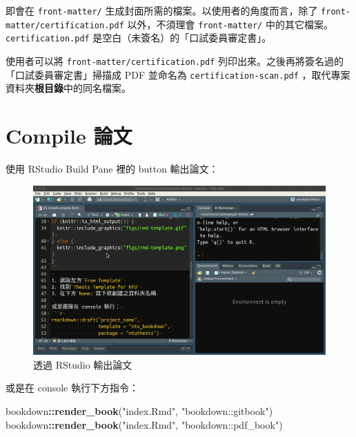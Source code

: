 \documentclass[oneside]{book}
\newenvironment{Shaded}{\begin{snugshade}}{\end{snugshade}}
\newcommand{\KeywordTok}[1]{\textcolor[rgb]{0.13,0.29,0.53}{\textbf{#1}}}
\newcommand{\NormalTok}[1]{#1}
\newcommand{\OperatorTok}[1]{\textcolor[rgb]{0.81,0.36,0.00}{\textbf{#1}}}
\newcommand{\StringTok}[1]{\textcolor[rgb]{0.31,0.60,0.02}{#1}}
\theoremstyle{definition}
\theoremstyle{definition}
\theoremstyle{definition}
\theoremstyle{remark}
\begin{document}
即會在 \texttt{front-matter/} 生成封面所需的檔案。以使用者的角度而言，除了 \texttt{front-matter/certification.pdf} 以外，不須理會 \texttt{front-matter/} 中的其它檔案。\texttt{certification.pdf} 是空白（未簽名）的「口試委員審定書」。

使用者可以將 \texttt{front-matter/certification.pdf} 列印出來。之後再將簽名過的「口試委員審定書」掃描成 PDF 並命名為 \texttt{certification-scan.pdf} ，取代專案資料夾\textbf{根目錄}中的同名檔案。

\hypertarget{compile-thesis}{%
\section{Compile 論文}\label{compile-thesis}}

使用 RStudio Build Pane 裡的 button 輸出論文：

\begin{figure}

{\centering \includegraphics[width=1\linewidth]{figs/build-button} 

}

\caption{透過 RStudio 輸出論文}\label{fig:unnamed-chunk-2}
\end{figure}

或是在 console 執行下方指令：

\begin{Shaded}
\begin{Highlighting}[]
\NormalTok{bookdown}\OperatorTok{::}\KeywordTok{render_book}\NormalTok{(}\StringTok{"index.Rmd"}\NormalTok{, }\StringTok{"bookdown::gitbook"}\NormalTok{)}
\NormalTok{bookdown}\OperatorTok{::}\KeywordTok{render_book}\NormalTok{(}\StringTok{"index.Rmd"}\NormalTok{, }\StringTok{"bookdown::pdf_book"}\NormalTok{)}
\end{Highlighting}
\end{Shaded}
\end{document}
